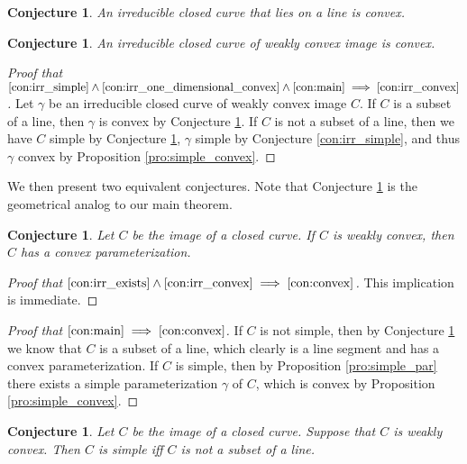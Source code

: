 \documentclass{amsart}
\newtheorem{conjecture}[proposition]{Conjecture}
\theoremstyle{definition}
\theoremstyle{remark}
\begin{document}
\begin{conjecture}
    \label{con:irr_one_dimensional_convex}
    An irreducible closed curve that lies on a line is convex.
\end{conjecture}

\begin{conjecture}
    \label{con:irr_convex}
    An irreducible closed curve of weakly convex image is convex.
\end{conjecture}

\begin{proof}[Proof that
        $\ref{con:irr_simple}
            \land\ref{con:irr_one_dimensional_convex}
            \land\ref{con:main}
            \implies\ref{con:irr_convex}$]
    Let $\gamma$ be an irreducible closed curve of weakly convex
    image $C$. If $C$ is a subset of a line, then $\gamma$
    is convex by Conjecture \ref{con:irr_one_dimensional_convex}.
    If $C$ is not a subset of a line,
    then we have $C$ simple by Conjecture \ref{con:main},
    $\gamma$ simple by Conjecture \ref{con:irr_simple},
    and thus $\gamma$ convex by Proposition \ref{pro:simple_convex}.
\end{proof}

We then present two equivalent conjectures.
Note that Conjecture \ref{con:main} is the geometrical analog to
our main theorem.

\begin{conjecture}
    \label{con:convex}
    Let $C$ be the image of a closed curve. If $C$ is weakly convex,
    then $C$ has a convex parameterization.
\end{conjecture}

\begin{proof}[Proof that
        $\ref{con:irr_exists}
            \land\ref{con:irr_convex}
            \implies\ref{con:convex}$]
    This implication is immediate.
\end{proof}

\begin{proof}[Proof that $\ref{con:main}\implies\ref{con:convex}$]
    If $C$ is not simple, then by Conjecture
    \ref{con:main} we know that $C$ is a subset of a line,
    which clearly is a line segment and has a convex parameterization.
    If $C$ is simple, then by Proposition \ref{pro:simple_par}
    there exists a simple parameterization $\gamma$ of $C$,
    which is convex by Proposition \ref{pro:simple_convex}.
\end{proof}

\begin{conjecture}
    \label{con:main}
    Let $C$ be the image of a closed curve.
    Suppose that $C$ is weakly convex.
    Then $C$ is simple iff $C$ is not a subset of a line.
\end{conjecture}
\end{document}
